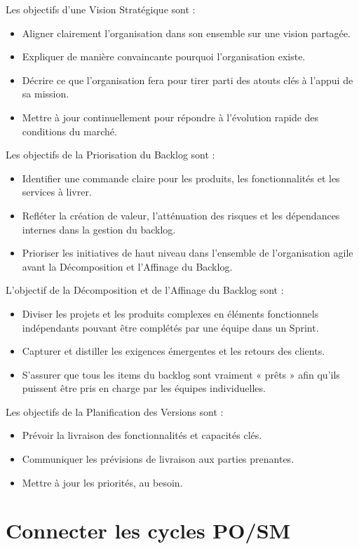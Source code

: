 \documentclass[12pt,a4paper,parskip=full]{scrartcl}
\begin{document}
Les objectifs d’une Vision Stratégique sont :
\begin{itemize}
\item Aligner clairement l’organisation dans son ensemble sur une vision partagée.
\item Expliquer de manière convaincante pourquoi l'organisation existe.
\item Décrire ce que l'organisation fera pour tirer parti des atouts clés à l'appui de sa
mission.
\item Mettre à jour continuellement pour répondre à l'évolution rapide des conditions
du marché.
\end{itemize}
Les objectifs de la Priorisation du Backlog sont :
\begin{itemize}
\item Identifier une commande claire pour les produits, les fonctionnalités et les
services à livrer.
\item Refléter la création de valeur, l'atténuation des risques et les dépendances
internes dans la gestion du backlog.
\item Prioriser les initiatives de haut niveau dans l'ensemble de l'organisation agile
avant la Décomposition et l’Affinage du Backlog.
\end{itemize}
L’objectif de la Décomposition et de l’Affinage du Backlog sont :
\begin{itemize}
\item Diviser les projets et les produits complexes en éléments fonctionnels
indépendants pouvant être complétés par une équipe dans un Sprint.
\item Capturer et distiller les exigences émergentes et les retours des clients.
\item S'assurer que tous les items du backlog sont vraiment « prêts » afin qu'ils
puissent être pris en charge par les équipes individuelles.
\end{itemize}
Les objectifs de la Planification des Versions sont :
\begin{itemize}
\item Prévoir la livraison des fonctionnalités et capacités clés.
\item Communiquer les prévisions de livraison aux parties prenantes.
\item Mettre à jour les priorités, au besoin.
\end{itemize}

\section{Connecter les cycles PO/SM}
\end{document}
